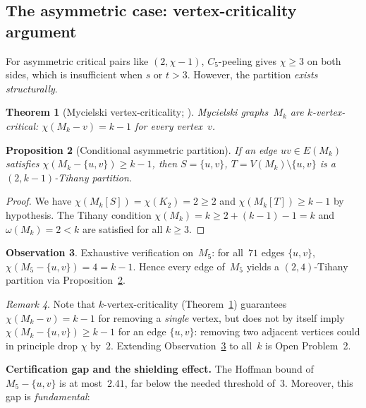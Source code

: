 \documentclass[11pt,a4paper]{amsart}
\theoremstyle{plain}
\newtheorem{theorem}{Theorem}[section]
\newtheorem{proposition}[theorem]{Proposition}
\theoremstyle{definition}
\newtheorem{observation}[theorem]{Observation}
\theoremstyle{remark}
\newtheorem{remark}[theorem]{Remark}
\newcommand{\chr}{\chi}
\newcommand{\om}{\omega}
\begin{document}
\subsection{The asymmetric case: vertex-criticality argument}
\label{ssec:asymmetric}

For asymmetric critical pairs like $(2, \chr{-}1)$, $C_5$-peeling gives
$\chr \geq 3$ on both sides, which is insufficient when $s$ or $t > 3$.
However, the partition \emph{exists structurally}.

\begin{theorem}[Mycielski vertex-criticality; {\cite{mycielski1955}}]
\label{thm:vertex-crit}
Mycielski graphs~$M_k$ are $k$-vertex-critical:
$\chr(M_k - v) = k - 1$ for every vertex~$v$.
\end{theorem}

\begin{proposition}[Conditional asymmetric partition]\label{prop:asym-cond}
If an edge $uv \in E(M_k)$ satisfies $\chr(M_k - \{u,v\}) \geq k - 1$, then
$S = \{u,v\}$, $T = V(M_k) \setminus \{u,v\}$ is a $(2, k{-}1)$-Tihany
partition.
\end{proposition}

\begin{proof}
We have $\chr(M_k[S]) = \chr(K_2) = 2 \geq 2$ and
$\chr(M_k[T]) \geq k-1$ by hypothesis.  The Tihany condition
$\chr(M_k) = k \geq 2 + (k{-}1) - 1 = k$ and
$\om(M_k) = 2 < k$ are satisfied for all $k \geq 3$.
\end{proof}

\begin{observation}\label{obs:edge-verify}
Exhaustive verification on~$M_5$: for all~$71$ edges $\{u,v\}$,
$\chr(M_5 - \{u,v\}) = 4 = k - 1$.  Hence every edge of~$M_5$ yields a
$(2,4)$-Tihany partition via Proposition~\ref{prop:asym-cond}.
\end{observation}

\begin{remark}
Note that $k$-vertex-criticality (Theorem~\ref{thm:vertex-crit}) guarantees
$\chr(M_k - v) = k-1$ for removing a \emph{single} vertex, but does not by
itself imply $\chr(M_k - \{u,v\}) \geq k-1$ for an edge $\{u,v\}$: removing
two adjacent vertices could in principle drop $\chr$ by~$2$.  Extending
Observation~\ref{obs:edge-verify} to all~$k$ is Open Problem~2.
\end{remark}

\medskip\noindent
\textbf{Certification gap and the shielding effect.}
The Hoffman bound of $M_5 - \{u,v\}$ is at most~$2.41$, far below the needed
threshold of~$3$.  Moreover, this gap is \emph{fundamental}:
\end{document}
